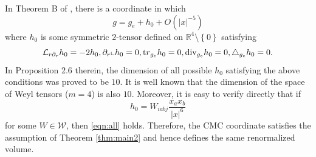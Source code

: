 \documentclass{amsart}
\newcommand{\abs}[1]{\left\vert#1\right\vert}
\newcommand{\set}[1]{\left\{#1\right\}}
\newcommand{\Real}{\mathbb R}
\numberwithin{equation}{section}
\begin{document}
In Theorem B of \cite{biquard2023renormalized}, there is a coordinate in which
\[
	g= g_e + h_0 + O(\abs{x}^{-5})
\]
where $h_0$ is some symmetric $2$-tensor defined on $\Real^4\setminus \set{0}$ satisfying
\begin{equation}
	\label{eqn:all}
	\mathcal L_{r\partial_r} h_0= -2h_0, \partial_r \llcorner h_0=0, {\mathrm tr}_{g_e}h_0=0, {\rm div}_{g_e}h_0=0, \triangle_{g_e}h_0=0.
\end{equation}
In Proposition 2.6 therein, the dimension of all possible $h_0$ satisfying the above conditions was proved to be $10$. It is well known that the dimension of the space of Weyl tensors ($m=4$) is also $10$. Moreover, it is easy to verify directly that if
\[
	h_0= W_{iabj}\frac{x_ax_b}{\abs{x}^6}
\]
for some $W\in \mathcal W$, then \eqref{eqn:all} holds. Therefore, the CMC coordinate satisfies the assumption of Theorem \ref{thm:main2} and hence defines the same renormalized volume.






\end{document}

